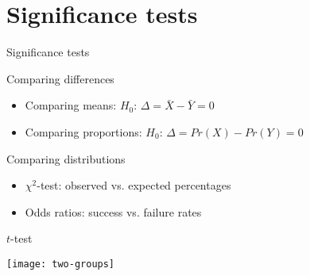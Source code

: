 \documentclass[t]{beamer}
\begin{document}
	\section{Significance tests}

	\begin{frame}[t]{Significance tests}

		\begin{block}{Comparing differences}

			\begin{itemize}
				\item Comparing means: $H_0$: $\Delta = \bar{X} - \bar{Y} = 0$ %
					\hfill {}
				\item Comparing proportions: $H_0$: $\Delta = Pr(X) - Pr(Y) = 0$ %
					\hfill {}
			\end{itemize}
		\end{block}
		
		\begin{block}{Comparing distributions}

			\begin{itemize}
				\item $\chi^2$-test: observed vs. expected percentages %
					\hfill {}
				\item Odds ratios: success vs. failure rates %
					\hfill {}
			\end{itemize}

		\end{block}

	\end{frame}

	\begin{frame}[c]{$t$-test}

		\texttt{[image: two-groups]}

	\end{frame}
		
\end{document}
